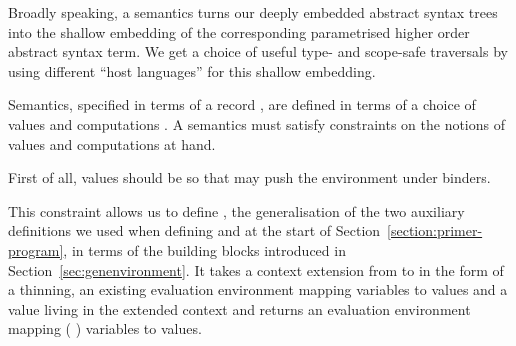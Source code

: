\begin{agdasnippet}
\end{agdasnippet}

Broadly speaking, a semantics turns our deeply embedded abstract syntax
trees into the shallow embedding of the corresponding parametrised higher
order abstract syntax term. We get a choice of useful type- and scope-safe
traversals by using different ``host languages'' for this shallow embedding.

Semantics, specified in terms of a record \semrec{}, are defined in terms
of a choice of values  and computations . A semantics must
satisfy constraints on the notions of values  and computations 
at hand.



\begin{agdasnippet}
\label{section:lamsem}
\end{agdasnippet}
First of all, values  should be  so that \semfun{} may push
the environment under binders.

\begin{agdasnippet}
\addtolength{\leftskip}{\parindent}
\end{agdasnippet}
This constraint allows us to define , the generalisation of
the two auxiliary definitions we used when defining  and
 at the start of Section~\ref{section:primer-program}, in
terms of the building blocks introduced in
Section~\ref{sec:genenvironment}.  It takes a context extension from
 to  in the form of a thinning, an existing evaluation
environment mapping  variables to  values and a value
living in the extended context  and returns an evaluation
environment mapping ({  }) variables to 
values.

